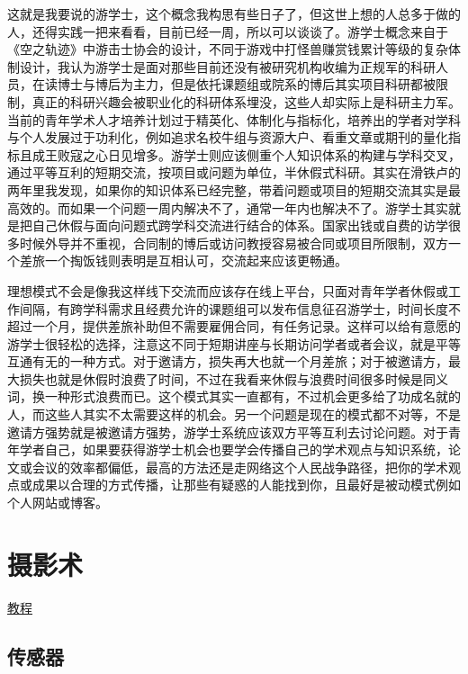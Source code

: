 \documentclass[
  letterpaper,
  DIV=11,
  numbers=noendperiod]{scrreprt}
\begin{document}
这就是我要说的游学士，这个概念我构思有些日子了，但这世上想的人总多于做的人，还得实践一把来看看，目前已经一周，所以可以谈谈了。游学士概念来自于《空之轨迹》中游击士协会的设计，不同于游戏中打怪兽赚赏钱累计等级的复杂体制设计，我认为游学士是面对那些目前还没有被研究机构收编为正规军的科研人员，在读博士与博后为主力，但是依托课题组或院系的博后其实项目科研都被限制，真正的科研兴趣会被职业化的科研体系埋没，这些人却实际上是科研主力军。当前的青年学术人才培养计划过于精英化、体制化与指标化，培养出的学者对学科与个人发展过于功利化，例如追求名校牛组与资源大户、看重文章或期刊的量化指标且成王败寇之心日见增多。游学士则应该侧重个人知识体系的构建与学科交叉，通过平等互利的短期交流，按项目或问题为单位，半休假式科研。其实在滑铁卢的两年里我发现，如果你的知识体系已经完整，带着问题或项目的短期交流其实是最高效的。而如果一个问题一周内解决不了，通常一年内也解决不了。游学士其实就是把自己休假与面向问题式跨学科交流进行结合的体系。国家出钱或自费的访学很多时候外导并不重视，合同制的博后或访问教授容易被合同或项目所限制，双方一个差旅一个掏饭钱则表明是互相认可，交流起来应该更畅通。

理想模式不会是像我这样线下交流而应该存在线上平台，只面对青年学者休假或工作间隔，有跨学科需求且经费允许的课题组可以发布信息征召游学士，时间长度不超过一个月，提供差旅补助但不需要雇佣合同，有任务记录。这样可以给有意愿的游学士很轻松的选择，注意这不同于短期讲座与长期访问学者或者会议，就是平等互通有无的一种方式。对于邀请方，损失再大也就一个月差旅；对于被邀请方，最大损失也就是休假时浪费了时间，不过在我看来休假与浪费时间很多时候是同义词，换一种形式浪费而已。这个模式其实一直都有，不过机会更多给了功成名就的人，而这些人其实不太需要这样的机会。另一个问题是现在的模式都不对等，不是邀请方强势就是被邀请方强势，游学士系统应该双方平等互利去讨论问题。对于青年学者自己，如果要获得游学士机会也要学会传播自己的学术观点与知识系统，论文或会议的效率都偏低，最高的方法还是走网络这个人民战争路径，把你的学术观点或成果以合理的方式传播，让那些有疑惑的人能找到你，且最好是被动模式例如个人网站或博客。

\section{摄影术}\label{ux6444ux5f71ux672f}

\href{http://www.cambridgeincolour.com/tutorials.htm}{教程}

\subsection{传感器}\label{ux4f20ux611fux5668}
\end{document}
